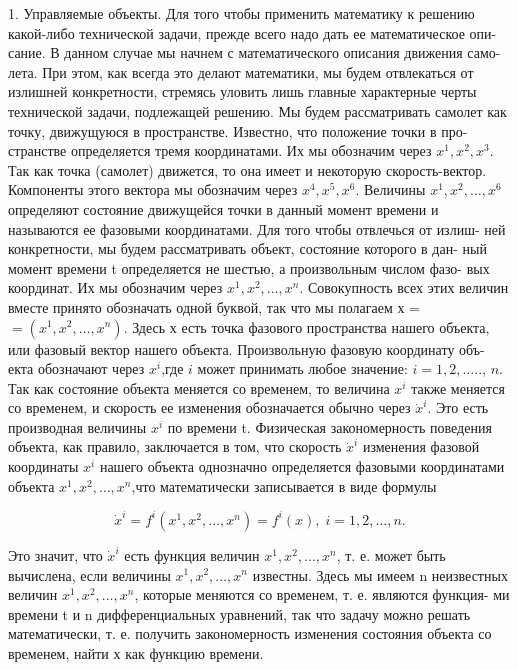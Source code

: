 \documentclass[10pt]{article}
\begin{document}
1. Управляемые объекты. Для того чтобы применить математику к решению какой-либо технической задачи, прежде всего надо дать ее математическое опи- сание. В данном случае мы начнем с математического описания движения само- лета. При этом, как всегда это делают математики, мы будем отвлекаться от излишней конкретности, стремясь уловить лишь главные характерные черты технической задачи, подлежащей решению. Мы будем рассматривать самолет как точку, движущуюся в пространстве. Известно, что положение точки в про- странстве определяется тремя координатами. Их мы обозначим через \({x}^{1},{x}^{2},{x}^{3}\). Так как точка (самолет) движется, то она имеет и некоторую скорость-вектор. Компоненты этого вектора мы обозначим через \({x}^{4},{x}^{5},{x}^{6}\). Величины \({x}^{1},{x}^{2},\ldots,{x}^{6}\) определяют состояние движущейся точки в данный момент времени и называются ее фазовыми координатами. Для того чтобы отвлечься от излиш- ней конкретности, мы будем рассматривать объект, состояние которого в дан- ный момент времени t определяется не шестью, а произвольным числом фазо- вых координат. Их мы обозначим через \({x}^{1},{x}^{2},\ldots,{x}^{n}\). Совокупность всех этих величин вместе принято обозначать одной буквой, так что мы полагаем х = \(= \left( {{x}^{1},{x}^{2},\ldots,{x}^{n}}\right)\). Здесь х есть точка фазового пространства нашего объекта, или фазовый вектор нашего объекта. Произвольную фазовую координату объ- екта обозначают через \({x}^{i}\),где \(i\) может принимать любое значение: \(i = 1,2,\ldots\).., \(n\). Так как состояние объекта меняется со временем, то величина \({x}^{i}\) также меняется со временем, и скорость ее изменения обозначается обычно через \({\dot{x}}^{i}\). Это есть производная величины \({x}^{i}\) по времени t. Физическая закономерность поведения объекта, как правило, заключается в том, что скорость \({\dot{x}}^{i}\) изменения фазовой координаты \({x}^{i}\) нашего объекта однозначно определяется фазовыми координатами объекта \({x}^{1},{x}^{2},\ldots,{x}^{n}\),что математически записывается в виде формулы

\[
{\dot{x}}^{i} = {f}^{i}\left( {{x}^{1},{x}^{2},\ldots,{x}^{n}}\right)  = {f}^{i}\left( x\right),\;i = 1,2,\ldots,n. \tag{1}
\]

Это значит, что \({\dot{x}}^{i}\) есть функция величин \({x}^{1},{x}^{2},\ldots,{x}^{n}\), т. е. может быть вычислена, если величины \({x}^{1},{x}^{2},\ldots,{x}^{n}\) известны. Здесь мы имеем n неизвестных величин \({x}^{1},{x}^{2},\ldots,{x}^{n}\), которые меняются со временем, т. е. являются функция- ми времени t и n дифференциальных уравнений, так что задачу можно решать математически, т. е. получить закономерность изменения состояния объекта со временем, найти х как функцию времени.
\end{document}
